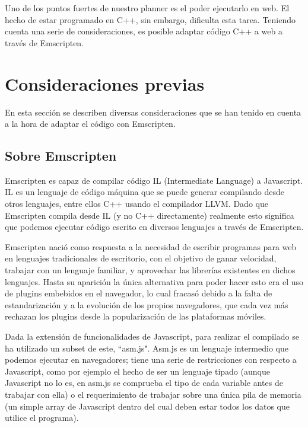 Uno de los puntos fuertes de nuestro planner es el poder ejecutarlo en web. El hecho de estar programado en C++, sin embargo, dificulta esta tarea. Teniendo cuenta una serie de consideraciones, es posible adaptar código C++ a web a través de Emscripten.

\label{emscripten}
\section{Consideraciones previas}
En esta sección se describen diversas consideraciones que se han tenido en cuenta a la hora de adaptar el código con Emscripten.


\subsection{Sobre Emscripten}
\label{about_emscripten}
Emscripten es capaz de compilar código IL (Intermediate Language) a Javascript. IL es un lenguaje de código máquina que se puede generar compilando desde otros lenguajes, entre ellos C++ usando el compilador LLVM. Dado que Emscripten compila desde IL (y no C++ directamente) realmente esto significa que podemos ejecutar código escrito en diversos lenguajes a través de Emscripten.

Emscripten nació como respuesta a la necesidad de escribir programas para web en lenguajes tradicionales de escritorio, con el objetivo de ganar velocidad, trabajar con un lenguaje familiar, y aprovechar las librerías existentes en dichos lenguajes. Hasta su aparición la única alternativa para poder hacer esto era el uso de plugins embebidos en el navegador, lo cual fracasó debido a la falta de estandarización y a la evolución de los propios navegadores, que cada vez más rechazan los plugins desde la popularización de las plataformas móviles.

Dada la extensión de funcionalidades de Javascript, para realizar el compilado se ha utilizado un subset de este, ``asm.js". Asm.js es un lenguaje intermedio que podemos ejecutar en navegadores; tiene una serie de restricciones con respecto a Javascript, como por ejemplo el hecho de ser un lenguaje tipado (aunque Javascript no lo es, en asm.js se comprueba el tipo de cada variable antes de trabajar con ella) o el requerimiento de trabajar sobre una única pila de memoria (un simple array de Javascript dentro del cual deben estar todos los datos que utilice el programa).

